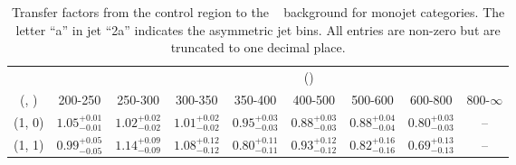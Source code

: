 \begin{table}[h!]
\tiny
\centering
\caption{Transfer factors from the \mj control region to the \zInv~ background for monojet categories. The letter ``a'' in jet \eg ``2a''  indicates the asymmetric jet bins. All entries are non-zero but are truncated to one decimal place.\label{tab:tf_mu_zinv_mono}}
\begin{tabular}
{ccccccccc}
	\hline\hline
&	& \multicolumn{8}{c}{\scalht (\gev)} \\ 
	 (\njet,  \nb) & 200-250 & 250-300 & 300-350 & 350-400 & 400-500 & 500-600 & 600-800 & 800-$\infty$ \\ [0.8ex] 
\hline
	(1, 0) & $1.05^{+ 0.01 }_{- 0.01 }$ & $1.02^{+ 0.02 }_{- 0.02 }$ & $1.01^{+ 0.02 }_{- 0.02 }$ & $0.95^{+ 0.03 }_{- 0.03 }$ & $0.88^{+ 0.03 }_{- 0.03 }$ & $0.88^{+ 0.04 }_{- 0.04 }$ & $0.80^{+ 0.03 }_{- 0.03 }$ & -- \\[0.5ex] 
	(1, 1) & $0.99^{+ 0.05 }_{- 0.05 }$ & $1.14^{+ 0.09 }_{- 0.09 }$ & $1.08^{+ 0.12 }_{- 0.12 }$ & $0.80^{+ 0.11 }_{- 0.11 }$ & $0.93^{+ 0.12 }_{- 0.12 }$ & $0.82^{+ 0.16 }_{- 0.16 }$ & $0.69^{+ 0.13 }_{- 0.13 }$ & -- \\[0.5ex] 
	\hline
	\hline
\end{tabular}
\end{table}
